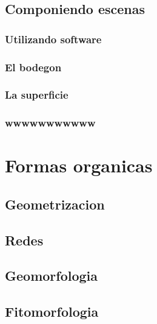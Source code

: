 \documentclass[
  16pt,
]{krantz}
\theoremstyle{definition}
\theoremstyle{definition}
\theoremstyle{definition}
\theoremstyle{definition}
\theoremstyle{remark}
\begin{document}
\hypertarget{componiendo-escenas}{%
\section{Componiendo escenas}\label{componiendo-escenas}}

\hypertarget{utilizando-software}{%
\subsection{Utilizando software}\label{utilizando-software}}

\hypertarget{el-bodegon}{%
\subsection{El bodegon}\label{el-bodegon}}

\hypertarget{la-superficie}{%
\subsection{La superficie}\label{la-superficie}}

\hypertarget{wwwwwwwwwww}{%
\subsection{wwwwwwwwwww}\label{wwwwwwwwwww}}

\hypertarget{formas-organicas}{%
\chapter{Formas organicas}\label{formas-organicas}}

\hypertarget{geometrizacion}{%
\section{Geometrizacion}\label{geometrizacion}}

\hypertarget{redes}{%
\section{Redes}\label{redes}}

\hypertarget{geomorfologia}{%
\section{Geomorfologia}\label{geomorfologia}}

\hypertarget{fitomorfologia}{%
\section{Fitomorfologia}\label{fitomorfologia}}
\end{document}

